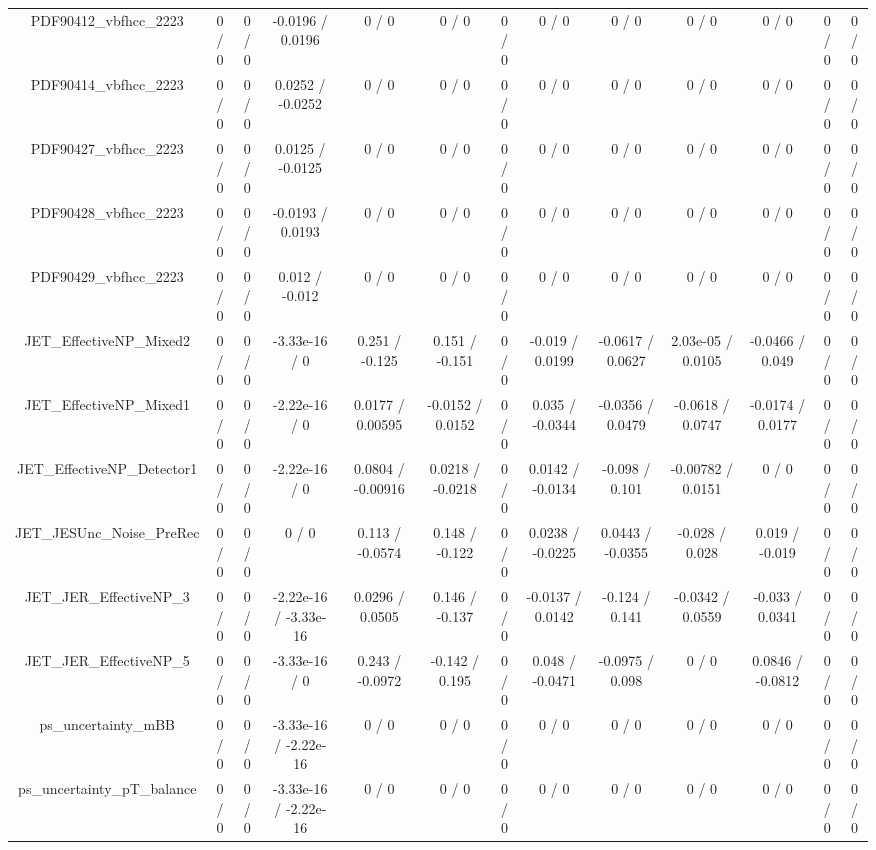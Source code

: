 \documentclass[10pt]{article}
\begin{document}
\begin{table}[htbp]
\begin{center}
\begin{tabular}{|c|c|c|c|c|c|c|c|c|c|c|c|c|}
  PDF90412_vbfhcc_2223 & 0 / 0 & 0 / 0 & -0.0196 / 0.0196 & 0 / 0 & 0 / 0 & 0 / 0 & 0 / 0 & 0 / 0 & 0 / 0 & 0 / 0 & 0 / 0 & 0 / 0 \\ 
  PDF90414_vbfhcc_2223 & 0 / 0 & 0 / 0 & 0.0252 / -0.0252 & 0 / 0 & 0 / 0 & 0 / 0 & 0 / 0 & 0 / 0 & 0 / 0 & 0 / 0 & 0 / 0 & 0 / 0 \\ 
  PDF90427_vbfhcc_2223 & 0 / 0 & 0 / 0 & 0.0125 / -0.0125 & 0 / 0 & 0 / 0 & 0 / 0 & 0 / 0 & 0 / 0 & 0 / 0 & 0 / 0 & 0 / 0 & 0 / 0 \\ 
  PDF90428_vbfhcc_2223 & 0 / 0 & 0 / 0 & -0.0193 / 0.0193 & 0 / 0 & 0 / 0 & 0 / 0 & 0 / 0 & 0 / 0 & 0 / 0 & 0 / 0 & 0 / 0 & 0 / 0 \\ 
  PDF90429_vbfhcc_2223 & 0 / 0 & 0 / 0 & 0.012 / -0.012 & 0 / 0 & 0 / 0 & 0 / 0 & 0 / 0 & 0 / 0 & 0 / 0 & 0 / 0 & 0 / 0 & 0 / 0 \\ 
  JET_EffectiveNP_Mixed2 & 0 / 0 & 0 / 0 & -3.33e-16 / 0 & 0.251 / -0.125 & 0.151 / -0.151 & 0 / 0 & -0.019 / 0.0199 & -0.0617 / 0.0627 & 2.03e-05 / 0.0105 & -0.0466 / 0.049 & 0 / 0 & 0 / 0 \\ 
  JET_EffectiveNP_Mixed1 & 0 / 0 & 0 / 0 & -2.22e-16 / 0 & 0.0177 / 0.00595 & -0.0152 / 0.0152 & 0 / 0 & 0.035 / -0.0344 & -0.0356 / 0.0479 & -0.0618 / 0.0747 & -0.0174 / 0.0177 & 0 / 0 & 0 / 0 \\ 
  JET_EffectiveNP_Detector1 & 0 / 0 & 0 / 0 & -2.22e-16 / 0 & 0.0804 / -0.00916 & 0.0218 / -0.0218 & 0 / 0 & 0.0142 / -0.0134 & -0.098 / 0.101 & -0.00782 / 0.0151 & 0 / 0 & 0 / 0 & 0 / 0 \\ 
  JET_JESUnc_Noise_PreRec & 0 / 0 & 0 / 0 & 0 / 0 & 0.113 / -0.0574 & 0.148 / -0.122 & 0 / 0 & 0.0238 / -0.0225 & 0.0443 / -0.0355 & -0.028 / 0.028 & 0.019 / -0.019 & 0 / 0 & 0 / 0 \\ 
  JET_JER_EffectiveNP_3 & 0 / 0 & 0 / 0 & -2.22e-16 / -3.33e-16 & 0.0296 / 0.0505 & 0.146 / -0.137 & 0 / 0 & -0.0137 / 0.0142 & -0.124 / 0.141 & -0.0342 / 0.0559 & -0.033 / 0.0341 & 0 / 0 & 0 / 0 \\ 
  JET_JER_EffectiveNP_5 & 0 / 0 & 0 / 0 & -3.33e-16 / 0 & 0.243 / -0.0972 & -0.142 / 0.195 & 0 / 0 & 0.048 / -0.0471 & -0.0975 / 0.098 & 0 / 0 & 0.0846 / -0.0812 & 0 / 0 & 0 / 0 \\ 
  ps_uncertainty_mBB & 0 / 0 & 0 / 0 & -3.33e-16 / -2.22e-16 & 0 / 0 & 0 / 0 & 0 / 0 & 0 / 0 & 0 / 0 & 0 / 0 & 0 / 0 & 0 / 0 & 0 / 0 \\ 
  ps_uncertainty_pT_balance & 0 / 0 & 0 / 0 & -3.33e-16 / -2.22e-16 & 0 / 0 & 0 / 0 & 0 / 0 & 0 / 0 & 0 / 0 & 0 / 0 & 0 / 0 & 0 / 0 & 0 / 0 \\ 

\end{tabular}
\end{center}
\end{table}
\end{document}
